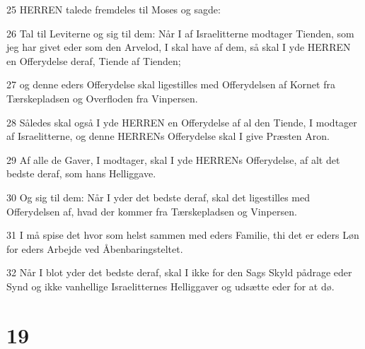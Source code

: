 \par 25 HERREN talede fremdeles til Moses og sagde:
\par 26 Tal til Leviterne og sig til dem: Når I af Israelitterne modtager Tienden, som jeg har givet eder som den Arvelod, I skal have af dem, så skal I yde HERREN en Offerydelse deraf, Tiende af Tienden;
\par 27 og denne eders Offerydelse skal ligestilles med Offerydelsen af Kornet fra Tærskepladsen og Overfloden fra Vinpersen.
\par 28 Således skal også I yde HERREN en Offerydelse af al den Tiende, I modtager af Israelitterne, og denne HERRENs Offerydelse skal I give Præsten Aron.
\par 29 Af alle de Gaver, I modtager, skal I yde HERRENs Offerydelse, af alt det bedste deraf, som hans Helliggave.
\par 30 Og sig til dem: Når I yder det bedste deraf, skal det ligestilles med Offerydelsen af, hvad der kommer fra Tærskepladsen og Vinpersen.
\par 31 I må spise det hvor som helst sammen med eders Familie, thi det er eders Løn for eders Arbejde ved Åbenbaringsteltet.
\par 32 Når I blot yder det bedste deraf, skal I ikke for den Sags Skyld pådrage eder Synd og ikke vanhellige Israelitternes Helliggaver og udsætte eder for at dø.

\chapter{19}

